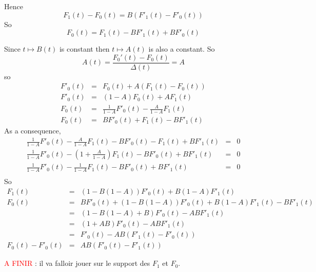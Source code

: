 
Hence 
 $$ F_1(t) - F_0(t) = B (F'_1(t) - F'_0(t))$$
 So 
 $$F_0(t) = F_1(t) - B  F'_1(t) +B  F'_0(t)$$
 
 Since $t  \mapsto B(t)$ is constant then  $t  \mapsto A(t)$ is also a constant. 
So 
$$ A(t) = \frac{F_0'(t)-F_0(t)}{\Delta(t)} = A$$
so
\begin{eqnarray*}
 F'_0(t) &=& F_0(t) +  A(F_1(t) - F_0(t))\\
 F'_0(t) &=& (1-A) F_0(t) + A F_1(t)\\
F_0(t) &=& \frac{1}{1-A} F'_0(t) - \frac{A}{1-A} F_1(t)\\
F_0(t) &=& B F'_0(t) + F_1(t)  - B F'_1(t) 
\end{eqnarray*}
As a consequence, 
\begin{eqnarray*}
 \frac{1}{1-A} F'_0(t) - \frac{A}{1-A} F_1(t) - B F'_0(t) - F_1(t)  +B F'_1(t) &=& 0\\
\frac{1}{1-A} F'_0(t) - \left(1+ \frac{A}{1-A}\right) F_1(t) - B F'_0(t) +B F'_1(t) &=& 0\\
 \frac{1}{1-A} F'_0(t) - \frac{1}{1-A} F_1(t) - B F'_0(t) +B F'_1(t) &=& 0\\
  \end{eqnarray*}
  So
  \begin{eqnarray*}
 F_1(t) &=&(1- B(1-A)) F'_0(t) + B(1-A)F'_1(t)\\
 F_0(t) &= &B F'_0(t) + (1- B(1-A)) F'_0(t) +B(1-A)F'_1(t) - BF'_1(t)\\
 &=& (1- B(1-A)+B)F'_0(t) -AB F'_1(t)\\
 &=& (1 + AB)F'_0(t) -  AB F'_1(t)\\
 &=& F'_0(t)  - AB( F'_1(t) -  F'_0(t)) \\
 F_0(t) - F'_0(t)&=&  AB( F'_0(t) -  F'_1(t)) 
  \end{eqnarray*}

 


\textcolor{red}{A FINIR} : il va falloir jouer sur le support des $F_1$ et $F_0$. 


%

